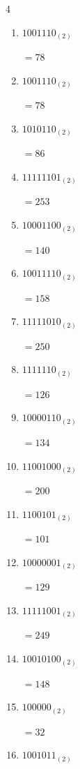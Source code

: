 \begin{multicols}{4}
\begin{enumerate}
        $=56$

  \item $1001110_{(2)}$

        $=78$

  \item $1001110_{(2)}$

        $=78$

  \item $1010110_{(2)}$

        $=86$

  \item $11111101_{(2)}$

        $=253$

  \item $10001100_{(2)}$

        $=140$

  \item $10011110_{(2)}$

        $=158$

  \item $11111010_{(2)}$

        $=250$

  \item $1111110_{(2)}$

        $=126$

  \item $10000110_{(2)}$

        $=134$

  \item $11001000_{(2)}$

        $=200$

  \item $1100101_{(2)}$

        $=101$

  \item $10000001_{(2)}$

        $=129$

\columnbreak %

  \item $11111001_{(2)}$

        $=249$

  \item $10010100_{(2)}$

        $=148$

  \item $100000_{(2)}$

        $=32$

  \item $1001011_{(2)}$


\end{enumerate}
\end{multicols}
